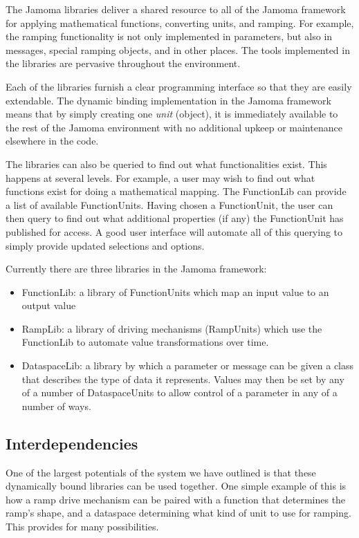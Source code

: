 \documentclass{article}
\begin{document}
The Jamoma libraries deliver a shared resource to all of the Jamoma framework for applying mathematical functions, converting units, and ramping. For example, the ramping functionality is not only implemented in parameters, but also in messages, special ramping objects, and in other places. The tools implemented in the libraries are pervasive throughout the environment.

Each of the libraries furnish a clear programming interface so that they are easily extendable. The dynamic binding implementation in the Jamoma framework means that by simply creating one \emph{unit} (object), it is immediately available to the rest of the Jamoma environment with no additional upkeep or maintenance elsewhere in the code.

The libraries can also be queried to find out what functionalities exist. This happens at several levels.  For example, a user may wish to find out what functions exist for doing a mathematical mapping. The FunctionLib can provide a list of available FunctionUnits. Having chosen a FunctionUnit, the user can then query to find out what additional properties (if any) the FunctionUnit has published for access. A good user interface will automate all of this querying to simply provide updated selections and options.

Currently there are three libraries in the Jamoma framework:
\begin{itemize}
	\item FunctionLib: a library of FunctionUnits which map an input value to an output value
	\item RampLib: a library of driving mechanisms (RampUnits) which use the FunctionLib to automate value transformations over time.
	\item DataspaceLib: a library by which a parameter or message can be given a class that describes the type of data it represents.  Values may then be set by any of a number of DataspaceUnits to allow control of a parameter in any of a number of ways.
\end{itemize}







\subsection{Interdependencies}\label{sec:interdependencies}

One of the largest potentials of the system we have outlined is that these dynamically bound libraries can be used together. One simple example of this is how a ramp drive mechanism can be paired with a function that determines the ramp's shape, and a dataspace determining what kind of unit to use for ramping.  This provides for many possibilities.
\end{document}
